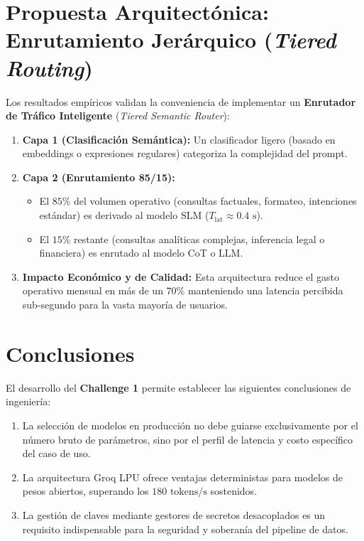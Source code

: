 \documentclass[12pt,letterpaper]{article}
\begin{document}
\section{Propuesta Arquitectónica: Enrutamiento Jerárquico (\textit{Tiered Routing})}

Los resultados empíricos validan la conveniencia de implementar un \textbf{Enrutador de Tráfico Inteligente} (\textit{Tiered Semantic Router}):

\begin{enumerate}
    \item \textbf{Capa 1 (Clasificación Semántica):} Un clasificador ligero (basado en embeddings o expresiones regulares) categoriza la complejidad del prompt.
    \item \textbf{Capa 2 (Enrutamiento 85/15):}
    \begin{itemize}
        \item El $85\%$ del volumen operativo (consultas factuales, formateo, intenciones estándar) es derivado al modelo SLM ($T_{\text{lat}} \approx 0.4\text{ s}$).
        \item El $15\%$ restante (consultas analíticas complejas, inferencia legal o financiera) es enrutado al modelo CoT o LLM.
    \end{itemize}
    \item \textbf{Impacto Económico y de Calidad:} Esta arquitectura reduce el gasto operativo mensual en más de un $70\%$ manteniendo una latencia percibida sub-segundo para la vasta mayoría de usuarios.
\end{enumerate}

\section{Conclusiones}

El desarrollo del \textbf{Challenge 1} permite establecer las siguientes conclusiones de ingeniería:
\begin{enumerate}
    \item La selección de modelos en producción no debe guiarse exclusivamente por el número bruto de parámetros, sino por el perfil de latencia y costo específico del caso de uso.
    \item La arquitectura Groq LPU ofrece ventajas deterministas para modelos de pesos abiertos, superando los $180\text{ tokens/s}$ sostenidos.
    \item La gestión de claves mediante gestores de secretos desacoplados es un requisito indispensable para la seguridad y soberanía del pipeline de datos.
\end{enumerate}
\end{document}
